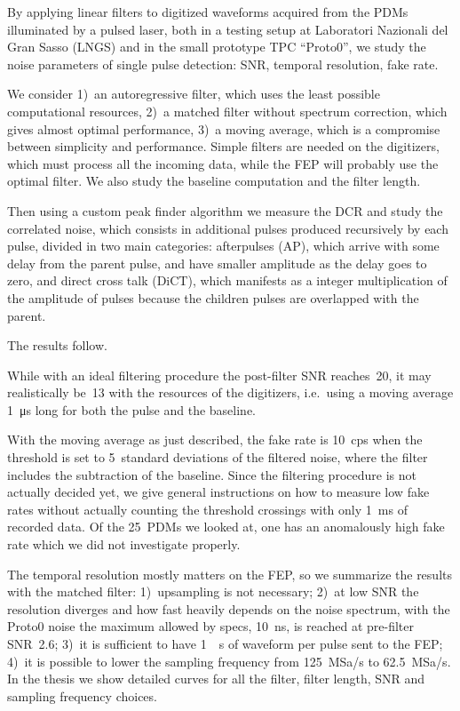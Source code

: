 \documentclass[11pt]{article}
\begin{document}
    By applying linear filters to digitized waveforms acquired from the PDMs
    illuminated by a pulsed laser, both in a testing setup at Laboratori
    Nazionali del Gran Sasso (LNGS) and in the small prototype TPC ``Proto0'',
    we study the noise parameters of single pulse detection: SNR, temporal
    resolution, fake rate.
    
    We consider 1)~an autoregressive filter, which uses the least possible
    computational resources, 2)~a matched filter without spectrum correction,
    which gives almost optimal performance, 3)~a moving average, which is a
    compromise between simplicity and performance. Simple filters are needed on
    the digitizers, which must process all the incoming data, while the FEP
    will probably use the optimal filter. We also study the baseline
    computation and the filter length.
    
    Then using a custom peak finder algorithm we measure the DCR and study the
    correlated noise, which consists in additional pulses produced recursively
    by each pulse, divided in two main categories: afterpulses (AP), which
    arrive with some delay from the parent pulse, and have smaller amplitude as
    the delay goes to zero, and direct cross talk (DiCT), which manifests as a
    integer multiplication of the amplitude of pulses because the children
    pulses are overlapped with the parent.
    
    The results follow.
    
    While with an ideal filtering procedure the post-filter SNR reaches~20, it
    may realistically be~13 with the resources of the digitizers, i.e.\ using a
    moving average \SI{1}{\micro s} long for both the pulse and the baseline.
    
    With the moving average as just described, the fake rate is \SI{10}{cps}
    when the threshold is set to 5~standard deviations of the filtered noise,
    where the filter includes the subtraction of the baseline. Since the
    filtering procedure is not actually decided yet, we give general
    instructions on how to measure low fake rates without actually counting the
    threshold crossings with only \SI{1}{ms} of recorded data. Of the 25~PDMs
    we looked at, one has an anomalously high fake rate which we did not
    investigate properly.

    The temporal resolution mostly matters on the FEP, so we summarize the
    results with the matched filter: 1)~upsampling is not necessary; 2)~at low
    SNR the resolution diverges and how fast heavily depends on the noise
    spectrum, with the Proto0 noise the maximum allowed by specs, \SI{10}{ns},
    is reached at pre-filter SNR~2.6; 3)~it is sufficient to have \SI{1}{\micro
    s} of waveform per pulse sent to the FEP; 4)~it is possible to lower the
    sampling frequency from \SI{125}{MSa/s} to \SI{62.5}{MSa/s}. In the thesis
    we show detailed curves for all the filter, filter length, SNR and sampling
    frequency choices.
    
\end{document}
